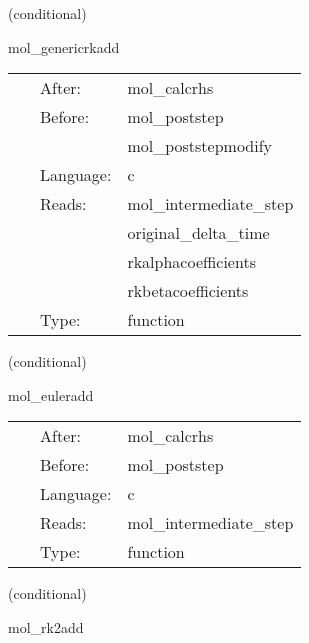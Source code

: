 \vspace{5mm}

   (conditional) 

\hspace{5mm} mol\_genericrkadd 

\hspace{5mm}{\it updates calculated with a generic method } 


\hspace{5mm}

 \begin{tabular*}{160mm}{cll} 
~ & After:  & mol\_calcrhs \\ 
~ & Before:  & mol\_poststep \\ 
~& ~ &mol\_poststepmodify\\ 
~ & Language:  & c \\ 
~ & Reads:  & mol\_intermediate\_step \\ 
~& ~ &original\_delta\_time\\ 
~& ~ &rkalphacoefficients\\ 
~& ~ &rkbetacoefficients\\ 
~ & Type:  & function \\ 
\end{tabular*} 


\vspace{5mm}

   (conditional) 

\hspace{5mm} mol\_euleradd 

\hspace{5mm}{\it updates calculated with the euler method } 


\hspace{5mm}

 \begin{tabular*}{160mm}{cll} 
~ & After:  & mol\_calcrhs \\ 
~ & Before:  & mol\_poststep \\ 
~ & Language:  & c \\ 
~ & Reads:  & mol\_intermediate\_step \\ 
~ & Type:  & function \\ 
\end{tabular*} 


\vspace{5mm}

   (conditional) 

\hspace{5mm} mol\_rk2add 

